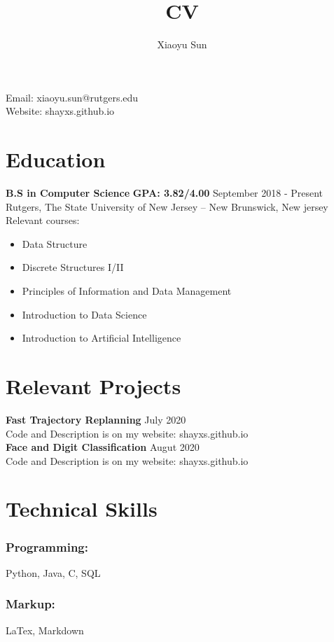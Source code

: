 \documentclass{article}
\makeatletter
\renewcommand{\maketitle}{
\begin{center}
{\huge\bfseries
\theauthor}

\vspace{.25em}

Email: xiaoyu.sun@rutgers.edu\\
Website: shayxs.github.io
\end{center}
}
\makeatother
\begin{document}
\title{CV}
\author{Xiaoyu Sun}
\maketitle

\section{Education}
\textbf{B.S in Computer Science} \space \textbf{GPA: 3.82/4.00}
\hfill{September 2018 - Present}\\
Rutgers, The State University of New Jersey – New Brunswick, New jersey\\
Relevant courses:
\begin{itemize}
  \itemsep0em
  \item Data Structure
  \item Discrete Structures I/II
  \item Principles of Information and Data Management
  \item Introduction to Data Science
  \item Introduction to Artificial Intelligence
\end{itemize}


\section{Relevant Projects}
\textbf{Fast Trajectory Replanning}
\hfill{July 2020}\\
Code and Description is on my website: shayxs.github.io\\

\noindent \textbf{Face and Digit Classification}
\hfill{Augut 2020}\\
Code and Description is on my website: shayxs.github.io
\section{Technical Skills}

\subsubsection{Programming:}

Python, Java, C, SQL

\subsubsection{Markup:}

LaTex, Markdown
\end{document}
